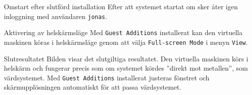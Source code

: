            {Omstart efter slutförd installation}
           {Efter att systemet startat om sker åter igen inloggning med
            användaren \texttt{jonas}.}
           {}

           {Aktivering av helskärmsläge}
           {Med \texttt{Guest Additions} installerat kan den virtuella maskinen
            köras i helskärmsläge genom att välja \texttt{Full-screen Mode} i
            menyn \texttt{View}.}
           {}

           {Slutresultatet}
           {Bilden visar det slutgiltiga resultatet. Den virtuella maskinen
            körs i helskärm och fungerar precis som om systemet kördes
            ''direkt mot metallen'', som värdsystemet.
            Med \texttt{Guest Additions} installerat justeras fönstret och
            skärmupplösningen automatiskt för att passa värdsystemet.}
           {}


